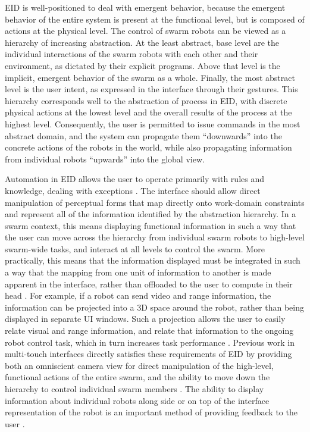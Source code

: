 EID is well-positioned to deal with emergent behavior, because the emergent behavior of the entire system is present at the functional level, but is composed of actions at the physical level.  
The control of swarm robots can be viewed as a hierarchy of increasing abstraction. 
At the least abstract, base level are the individual interactions of the swarm robots with each other and their environment, as dictated by their explicit programs. 
Above that level is the implicit, emergent behavior of the swarm as a whole. 
Finally, the most abstract level is the user intent, as expressed in the interface through their gestures. 
This hierarchy corresponds well to the abstraction of process in EID, with discrete physical actions at the lowest level and the overall results of the process at the highest level. 
Consequently, the user is permitted to issue commands in the most abstract domain, and the system can propagate them ``downwards'' into the concrete actions of the robots in the world, while also propagating information from individual robots ``upwards'' into the global view. 

Automation in EID allows the user to operate primarily with rules and knowledge, dealing with exceptions \citep{vicente2002ecological}.
The interface should allow direct manipulation of perceptual forms that map directly onto work-domain constraints and represent all of the information identified by the abstraction hierarchy. 
In a swarm context, this means displaying functional information in such a way that the user can move across the hierarchy from individual swarm robots to high-level swarm-wide tasks, and interact at all levels to control the swarm. 
More practically, this means that the information displayed must be integrated in such a way that the mapping from one unit of information to another is made apparent in the interface, rather than offloaded to the user to compute in their head \citep{yanco2004beyond}. 
For example, if a robot can send video and range information, the information can be projected into a 3D space around the robot, rather than being displayed in separate UI windows.
Such a projection allows the user to easily relate visual and range information, and relate that information to the ongoing robot control task, which in turn increases task performance \citep{ricks2004ecological}.
Previous work in multi-touch interfaces directly satisfies these requirements of EID by providing both an omniscient camera view for direct manipulation of the high-level, functional actions of the entire swarm, and the ability to move down the hierarchy to control individual swarm members \citep{Micire:2009:ANG:1731903.1731912}.
The ability to display information about individual robots along side or on top of the interface representation of the robot is an important method of providing feedback to the user \citep{Kato:2009:MIC:1520340.1520500}. 



